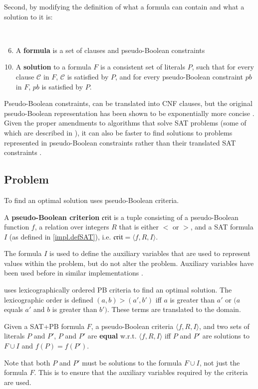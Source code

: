 Second, by modifying the definition of what a formula can contain and what a solution to it is:
\begin{defs}
{\ }
\begin{enumerate}
\setcounter{enumi}{5}
    \item A \textbf{formula} is a set of clauses and pseudo-Boolean constraints
\end{enumerate}
\begin{enumerate}
\setcounter{enumi}{9}
    \item A \textbf{solution} to a formula $F$ is a consistent set of literals $P$, such that for every clause $\mathcal{C}$ in $F$, $\mathcal{C}$ is satisfied by $P$,
    and for every pseudo-Boolean constraint $pb$ in $F$, $pb$ is satisfied by $P$. 
\end{enumerate}
\end{defs}

Pseudo-Boolean constraints, can be translated into CNF clauses, but the original pseudo-Boolean representation has been shown to be exponentially more concise \citep{dixon2004automating}.
Given the proper amendments to algorithms that solve SAT problems (some of which are described in \citep{Sheini2006}), 
it can also be faster to find solutions to problems represented in pseudo-Boolean constraints rather than their translated SAT constraints \citep{dixon2004automating}.

\subsection{\modelimpl Problem}
\label{impl.lexsatproblem}
To find an optimal solution \modelimpl uses pseudo-Boolean criteria.

\begin{defs}
A \textbf{pseudo-Boolean criterion} $\mathfrak{crit}$ is a tuple consisting of a pseudo-Boolean function $f$,
a relation over integers $R$ that is either $<$ or $>$, and a SAT formula $I$ (as defined in \ref{impl.defSAT}),
i.e. $\mathfrak{crit} = \langle f, R , I \rangle$.
\end{defs}
The formula $I$ is used to define the auxiliary variables that are used to represent values within the problem, but do not alter the problem.
Auxiliary variables have been used before in similar implementations \citep{argelich2010solving}.


\modelimpl uses lexicographically ordered PB criteria to find an optimal solution.
The lexicographic order is defined $(a,b) > (a',b')$ iff $a$ is greater than $a'$ or $(a$ equals $a'$ and $b$ is greater than $b')$.
These terms are translated to the \modelimpl domain.
\begin{defs}
Given a SAT+PB formula $F$, a pseudo-Boolean criteria $\langle f,R, I \rangle$, and two sets of literals $P$ and $P'$, 
$P$ and $P'$ are \textbf{equal} w.r.t. $\langle f,R, I \rangle$
iff $P$ and $P'$ are solutions to $F \cup I$ and $f(P) = f(P')$.
\end{defs}
Note that both $P$ and $P'$ must be solutions to the formula $F \cup I$, not just the formula $F$.
This is to ensure that the auxiliary variables required by the criteria are used.

